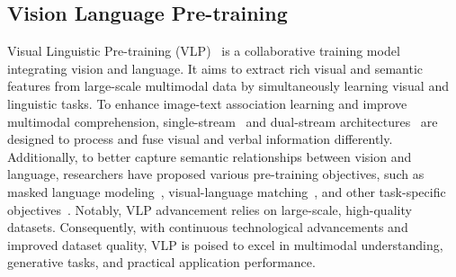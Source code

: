 \subsection{Vision Language Pre-training}
Visual Linguistic Pre-training (VLP)~\cite{chen2023vlp, wei2025leveraging} is a collaborative training model integrating vision and language. It aims to extract rich visual and semantic features from large-scale multimodal data by simultaneously learning visual and linguistic tasks. To enhance image-text association learning and improve multimodal comprehension, single-stream~\cite{li2020oscar, zhou2020unified, zhang2020devlbert} and dual-stream architectures~\cite{dou2022empirical} are designed to process and fuse visual and verbal information differently. Additionally, to better capture semantic relationships between vision and language, researchers have proposed various pre-training objectives, such as masked language modeling~\cite{NEURIPS2021_50525975}, visual-language matching~\cite{li2020hero}, and other task-specific objectives~\cite{zhou2020unified, jiang2020defense}. Notably, VLP advancement relies on large-scale, high-quality datasets. Consequently, with continuous technological advancements and improved dataset quality, VLP is poised to excel in multimodal understanding, generative tasks, and practical application performance.